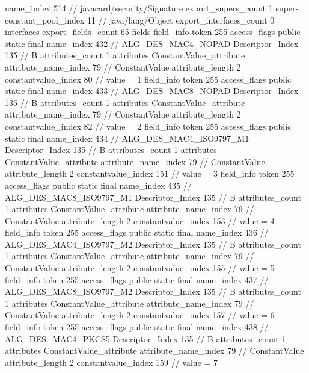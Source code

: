 {{{			name_index	514		// javacard/security/Signature
			export_supers_count	1
			supers {
				constant_pool_index	11		// java/lang/Object
			}
			export_interfaces_count	0
			interfaces {
			}
			export_fields_count	65
			fields {
			field_info {
				token	255
				access_flags	public static final
				name_index	432		// ALG_DES_MAC4_NOPAD
				Descriptor_Index	135		// B
				attributes_count	1
				attributes {
				ConstantValue_attribute {
					attribute_name_index	79		// ConstantValue
					attribute_length	2
					constantvalue_index	80		// value = 1
				}
				}
			}
			field_info {
				token	255
				access_flags	public static final
				name_index	433		// ALG_DES_MAC8_NOPAD
				Descriptor_Index	135		// B
				attributes_count	1
				attributes {
				ConstantValue_attribute {
					attribute_name_index	79		// ConstantValue
					attribute_length	2
					constantvalue_index	82		// value = 2
				}
				}
			}
			field_info {
				token	255
				access_flags	public static final
				name_index	434		// ALG_DES_MAC4_ISO9797_M1
				Descriptor_Index	135		// B
				attributes_count	1
				attributes {
				ConstantValue_attribute {
					attribute_name_index	79		// ConstantValue
					attribute_length	2
					constantvalue_index	151		// value = 3
				}
				}
			}
			field_info {
				token	255
				access_flags	public static final
				name_index	435		// ALG_DES_MAC8_ISO9797_M1
				Descriptor_Index	135		// B
				attributes_count	1
				attributes {
				ConstantValue_attribute {
					attribute_name_index	79		// ConstantValue
					attribute_length	2
					constantvalue_index	153		// value = 4
				}
				}
			}
			field_info {
				token	255
				access_flags	public static final
				name_index	436		// ALG_DES_MAC4_ISO9797_M2
				Descriptor_Index	135		// B
				attributes_count	1
				attributes {
				ConstantValue_attribute {
					attribute_name_index	79		// ConstantValue
					attribute_length	2
					constantvalue_index	155		// value = 5
				}
				}
			}
			field_info {
				token	255
				access_flags	public static final
				name_index	437		// ALG_DES_MAC8_ISO9797_M2
				Descriptor_Index	135		// B
				attributes_count	1
				attributes {
				ConstantValue_attribute {
					attribute_name_index	79		// ConstantValue
					attribute_length	2
					constantvalue_index	157		// value = 6
				}
				}
			}
			field_info {
				token	255
				access_flags	public static final
				name_index	438		// ALG_DES_MAC4_PKCS5
				Descriptor_Index	135		// B
				attributes_count	1
				attributes {
				ConstantValue_attribute {
					attribute_name_index	79		// ConstantValue
					attribute_length	2
					constantvalue_index	159		// value = 7
}}}}}}}
